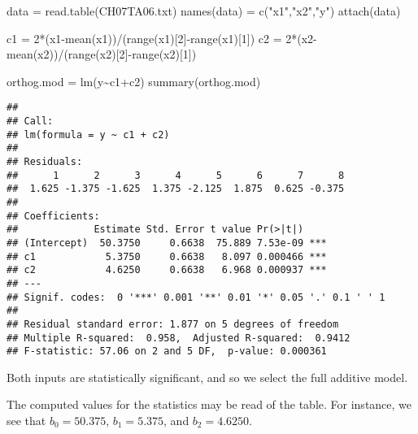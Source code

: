 \documentclass[
]{article}
\newenvironment{Shaded}{\begin{snugshade}}{\end{snugshade}}
\newcommand{\DecValTok}[1]{\textcolor[rgb]{0.00,0.00,0.81}{#1}}
\newcommand{\FunctionTok}[1]{\textcolor[rgb]{0.00,0.00,0.00}{#1}}
\newcommand{\NormalTok}[1]{#1}
\newcommand{\OtherTok}[1]{\textcolor[rgb]{0.56,0.35,0.01}{#1}}
\newcommand{\SpecialCharTok}[1]{\textcolor[rgb]{0.00,0.00,0.00}{#1}}
\newcommand{\StringTok}[1]{\textcolor[rgb]{0.31,0.60,0.02}{#1}}
\begin{document}
\begin{Shaded}
\begin{Highlighting}[]
\NormalTok{data }\OtherTok{=} \FunctionTok{read.table}\NormalTok{(}\StringTok{\textquotesingle{}CH07TA06.txt\textquotesingle{}}\NormalTok{)}
\FunctionTok{names}\NormalTok{(data) }\OtherTok{=} \FunctionTok{c}\NormalTok{(}\StringTok{"x1"}\NormalTok{,}\StringTok{"x2"}\NormalTok{,}\StringTok{"y"}\NormalTok{)}
\FunctionTok{attach}\NormalTok{(data)}

\NormalTok{c1 }\OtherTok{=} \DecValTok{2}\SpecialCharTok{*}\NormalTok{(x1}\SpecialCharTok{{-}}\FunctionTok{mean}\NormalTok{(x1))}\SpecialCharTok{/}\NormalTok{(}\FunctionTok{range}\NormalTok{(x1)[}\DecValTok{2}\NormalTok{]}\SpecialCharTok{{-}}\FunctionTok{range}\NormalTok{(x1)[}\DecValTok{1}\NormalTok{])}
\NormalTok{c2 }\OtherTok{=} \DecValTok{2}\SpecialCharTok{*}\NormalTok{(x2}\SpecialCharTok{{-}}\FunctionTok{mean}\NormalTok{(x2))}\SpecialCharTok{/}\NormalTok{(}\FunctionTok{range}\NormalTok{(x2)[}\DecValTok{2}\NormalTok{]}\SpecialCharTok{{-}}\FunctionTok{range}\NormalTok{(x2)[}\DecValTok{1}\NormalTok{])}

\NormalTok{orthog.mod }\OtherTok{=} \FunctionTok{lm}\NormalTok{(y}\SpecialCharTok{\textasciitilde{}}\NormalTok{c1}\SpecialCharTok{+}\NormalTok{c2)}
\FunctionTok{summary}\NormalTok{(orthog.mod)}
\end{Highlighting}
\end{Shaded}

\begin{verbatim}
## 
## Call:
## lm(formula = y ~ c1 + c2)
## 
## Residuals:
##      1      2      3      4      5      6      7      8 
##  1.625 -1.375 -1.625  1.375 -2.125  1.875  0.625 -0.375 
## 
## Coefficients:
##             Estimate Std. Error t value Pr(>|t|)    
## (Intercept)  50.3750     0.6638  75.889 7.53e-09 ***
## c1            5.3750     0.6638   8.097 0.000466 ***
## c2            4.6250     0.6638   6.968 0.000937 ***
## ---
## Signif. codes:  0 '***' 0.001 '**' 0.01 '*' 0.05 '.' 0.1 ' ' 1
## 
## Residual standard error: 1.877 on 5 degrees of freedom
## Multiple R-squared:  0.958,  Adjusted R-squared:  0.9412 
## F-statistic: 57.06 on 2 and 5 DF,  p-value: 0.000361
\end{verbatim}

Both inputs are statistically significant, and so we select the full
additive model.

The computed values for the statistics may be read of the table. For
instance, we see that \(b_0 = 50.375\), \(b_1 = 5.375\), and
\(b_2 = 4.6250\).
\end{document}
